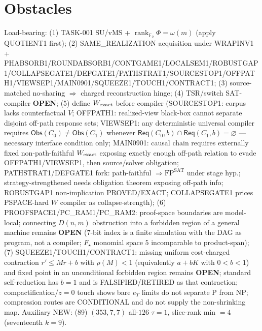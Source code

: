 \documentclass[11pt]{article}
\begin{document}
\section*{Obstacles}
Load-bearing: (1) TASK-001 SU/vMS + $\operatorname{rank}_{\mathbb F_2}\Phi=\omega(m)$ (apply QUOTIENT1 first);
(2) SAME\_REALIZATION acquisition under WRAPINV1 + PHABSORB1/ROUNDABSORB1/CONTGAME1/LOCALSEM1/ROBUSTGAP1/COLLAPSEGATE1/DEFGATE1/PATHSTRAT1/SOURCESTOP1/OFFPATH1/VIEWSEP1/MAIN0901/SQUEEZE1/TOUCH1/CONTRACT1;
(3) source-matched no-sharing $\Rightarrow$ charged reconstruction hinge;
(4) TSR/switch SAT-compiler \textbf{OPEN};
(5) define $W_{\rm exact}$ before compiler (SOURCESTOP1: corpus lacks counterfactual $V$;
OFFPATH1: realized-view black-box cannot separate disjoint off-path response sets;
VIEWSEP1: any deterministic universal compiler requires $\mathsf{Obs}(C_0)\ne\mathsf{Obs}(C_1)$
whenever $\mathsf{Req}(C_0,b)\cap\mathsf{Req}(C_1,b)=\varnothing$ --- necessary interface condition only;
MAIN0901: causal chain requires externally fixed non-path-faithful $W_{\rm exact}$ exposing
exactly enough off-path relation to evade OFFPATH1/VIEWSEP1, then source/solver obligation;
PATHSTRAT1/DEFGATE1 fork: path-faithful $\Rightarrow\mathrm{FP}^{\mathrm{SAT}}$ under stage hyp.;
strategy-strengthened needs obligation theorem exposing off-path info;
ROBUSTGAP1 non-implication PROVED/EXACT; COLLAPSEGATE1 prices PSPACE-hard $W$ compiler as collapse-strength);
(6) PROOFSPACE1/PC\_RAM1/PC\_RAM2: proof-space boundaries are model-local; connecting $D(n,m)$ obstruction into a
forbidden region of a general machine remains \textbf{OPEN} ($7$-bit index is a finite simulation with the DAG as program, not a compiler; $F_\star$ monomial space $5$ incomparable to product-span);
(7) SQUEEZE1/TOUCH1/CONTRACT1: missing uniform cost-charged contraction $r'\le Mr+b$ with $\rho(M){<}1$ (equivalently $a+bK$ with $0{<}b{<}1$) and fixed point in an unconditional forbidden region remains \textbf{OPEN};
standard self-reduction has $b{=}1$ and is FALSIFIED/RETIRED as that contraction; compactification/$z{=}0$ touch shows bare $e_T$ limits do not separate P from NP;
compression routes are CONDITIONAL and do not supply the non-shrinking map.
Auxiliary NEW: (89) $(353,7,7)$ all-$126$ $\tau{=}1$, slice-rank min $=4$ (seventeenth $k{=}9$).
\end{document}
